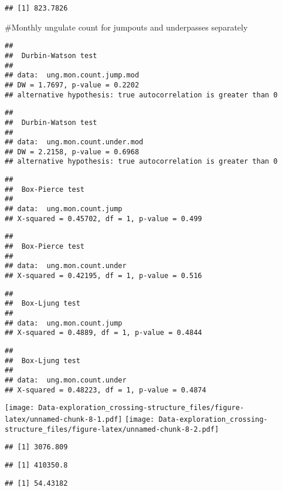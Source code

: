 \documentclass[]{article}
\begin{document}
\begin{verbatim}
## [1] 823.7826
\end{verbatim}

\#Monthly ungulate count for jumpouts and underpasses separately

\begin{verbatim}
## 
##  Durbin-Watson test
## 
## data:  ung.mon.count.jump.mod
## DW = 1.7697, p-value = 0.2202
## alternative hypothesis: true autocorrelation is greater than 0
\end{verbatim}

\begin{verbatim}
## 
##  Durbin-Watson test
## 
## data:  ung.mon.count.under.mod
## DW = 2.2158, p-value = 0.6968
## alternative hypothesis: true autocorrelation is greater than 0
\end{verbatim}

\begin{verbatim}
## 
##  Box-Pierce test
## 
## data:  ung.mon.count.jump
## X-squared = 0.45702, df = 1, p-value = 0.499
\end{verbatim}

\begin{verbatim}
## 
##  Box-Pierce test
## 
## data:  ung.mon.count.under
## X-squared = 0.42195, df = 1, p-value = 0.516
\end{verbatim}

\begin{verbatim}
## 
##  Box-Ljung test
## 
## data:  ung.mon.count.jump
## X-squared = 0.4889, df = 1, p-value = 0.4844
\end{verbatim}

\begin{verbatim}
## 
##  Box-Ljung test
## 
## data:  ung.mon.count.under
## X-squared = 0.48223, df = 1, p-value = 0.4874
\end{verbatim}

\texttt{[image: Data-exploration\_crossing-structure\_files/figure-latex/unnamed-chunk-8-1.pdf]}
\texttt{[image: Data-exploration\_crossing-structure\_files/figure-latex/unnamed-chunk-8-2.pdf]}

\begin{verbatim}
## [1] 3076.809
\end{verbatim}

\begin{verbatim}
## [1] 410350.8
\end{verbatim}

\begin{verbatim}
## [1] 54.43182
\end{verbatim}
\end{document}
